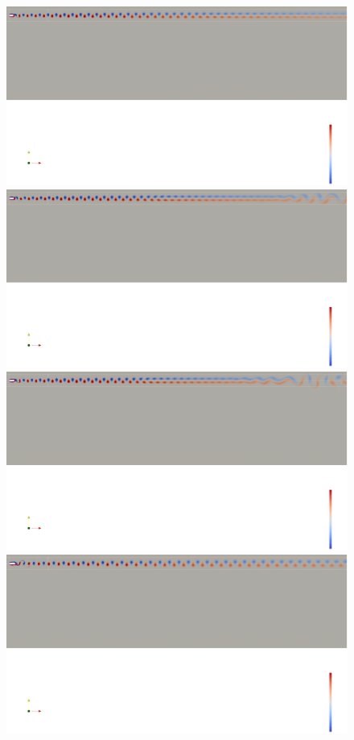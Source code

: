 \begin{figure}
  \includegraphics[trim={0 1060 0 0},clip,width=\textwidth]{./fig/appendix/AR2p5_Re450.png}
  \includegraphics[trim={0 1060 0 0},clip,width=\textwidth]{./fig/appendix/AR2p75_Re450.png}
  \includegraphics[trim={0 1060 0 0},clip,width=\textwidth]{./fig/appendix/AR3_Re450.png}
  \vspace{0.5cm}
  \includegraphics[trim={0 1060 0 0},clip,width=\textwidth]{./fig/appendix/AR3p5_Re450.png}

\end{figure}

